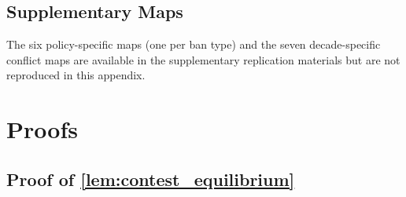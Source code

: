 \subsection{Supplementary Maps} \label{app:supplementary_maps}

The six policy-specific maps (one per ban type) and the seven decade-specific
conflict maps are available in the supplementary replication materials but are not reproduced in this appendix.

\section{Proofs} \label{app:proofs}

\subsection*{Proof of \autoref{lem:contest_equilibrium}} \label{app:proof:contest_equilibrium}

